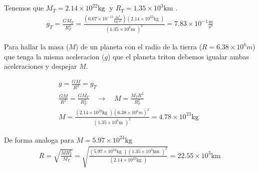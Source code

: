 \documentclass{article}
\begin{document}
\hfill 

\section{}
Tenemos que $ M_T = 2.14 \times10^{22 }\text{kg } $ y $ R_T = 1.35 \times10^{3 } \text{km } $.
\begin{gather*}
  g_T = \frac{GM_T}{R_T^2 } = \frac{(6.67 \times10^{-11 }\frac{m^3 }{\text{kg } \text{s}^2})(2.14 \times10^{22 }\text{kg })}{(1.35 \times10^{6 } \text{m })^2} = 7.83 \times10^{-1 } \frac{\text{m}}{\text{s}^2 }
\end{gather*}

Para hallar la masa ($ M  $) de un planeta con el radio de la tierra ($ R = 6.38 \times10^{6 }m $) que tenga la misma aceleracion ($ g $) que el planeta triton debemos igualar ambas aceleraciones y despejar $ M  $.

\begin{gather*}
  g = \frac{GM }{R^2 } = g_T \\
  \frac{GM }{R^2 } = \frac{GM_T}{R_T^2} \quad \rightarrow \quad M = \frac{M_T R^2 }{R_T^2 } \\
  M = \frac{(2.14 \times10^{22 }\text{kg })(6.38 \times10^{6 }m)^2}{(1.35 \times10^{6 } \text{m })^2} = 4.78 \times10^{23} \text{kg }
\end{gather*}

De forma analoga para $ M = 5.97 \times10^{24 }\text{kg } $
\begin{gather}
  R = \sqrt{\frac{M R_T^2 }{M_T }} = \sqrt{\frac{(5.97 \times10^{24 }\text{kg })(1.35 \times10^{3 } \text{km })^2}{(2.14 \times10^{22 }\text{kg })}} = 22.55 \times10^{3 }\text{km}
\end{gather}
\end{document}
